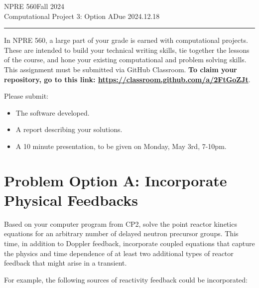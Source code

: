 \documentclass{article}
\newcommand{\class}{NPRE 560}
\newcommand{\term}{Fall 2024}
\newcommand{\assignment}{Computational Project 3: Option A}
\newcommand{\duedate}{2024.12.18}
\begin{document}
 


\class \hfill \term \\
\assignment \hfill Due \duedate\\
\rule[1ex]{\textwidth}{.1pt}


In \class, a large part of your grade is earned with computational projects. 
These are intended to build your technical writing skills, tie together the 
lessons of the course, and hone your existing computational and problem solving 
skills. This assignment must be submitted via GitHub Classroom. \textbf{To claim your 
repository, go to this link: \url{https://classroom.github.com/a/2FtGoZJt}}.

Please submit:
\begin{itemize} 
        \item The software developed.
        \item A report describing your solutions.
        \item A 10 minute presentation, to be given on Monday, May 3rd, 7-10pm.
\end{itemize}

\section{Problem Option A: Incorporate Physical Feedbacks}

Based on your computer program from CP2, solve the point reactor kinetics equations for an 
arbitrary number of delayed neutron precursor groups. This time, in addition to 
Doppler feedback, incorporate coupled equations that capture the physics and 
time dependence of at least two additional types of reactor feedback 
that might arise in a transient. 

For example, the following sources of reactivity feedback could be incorporated:
\end{document}
